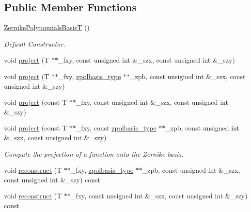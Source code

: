 \subsection*{Public Member Functions}
\begin{DoxyCompactItemize}
\item 
\hyperlink{classzsig_1_1ZernikePolynomialsBasisT_a214ad8861d4f318e10b7a3098ff9057e}{ZernikePolynomialsBasisT} ()
\begin{DoxyCompactList}\small\item\em Default Constructor. \item\end{DoxyCompactList}\item 
void \hyperlink{classzsig_1_1ZernikePolynomialsBasisT_aba8cb52c2e02043ec97114c7ad7f9041}{project} (T $\ast$$\ast$\_\-fxy, const unsigned int \&\_\-szx, const unsigned int \&\_\-szy)
\item 
void \hyperlink{classzsig_1_1ZernikePolynomialsBasisT_a0925687fb6a1c9f7fe6b22f4592fe96d}{project} (T $\ast$$\ast$\_\-fxy, \hyperlink{classzsig_1_1ZernikePolynomialsBasisT}{zpolbasis\_\-type} $\ast$$\ast$\_\-zpb, const unsigned int \&\_\-szx, const unsigned int \&\_\-szy)
\item 
void \hyperlink{classzsig_1_1ZernikePolynomialsBasisT_a3cdbccd97f083e952bcdc7640718f52f}{project} (const T $\ast$$\ast$\_\-fxy, const unsigned int \&\_\-szx, const unsigned int \&\_\-szy)
\item 
void \hyperlink{classzsig_1_1ZernikePolynomialsBasisT_abf9403a1fe296638542132488c8c7187}{project} (const T $\ast$$\ast$\_\-fxy, const \hyperlink{classzsig_1_1ZernikePolynomialsBasisT}{zpolbasis\_\-type} $\ast$$\ast$\_\-zpb, const unsigned int \&\_\-szx, const unsigned int \&\_\-szy)
\begin{DoxyCompactList}\small\item\em Compute the projection of a function onto the Zernike basis. \item\end{DoxyCompactList}\item 
void \hyperlink{classzsig_1_1ZernikePolynomialsBasisT_a62ba4a56669768b02abee187a5d2f1eb}{reconstruct} (T $\ast$$\ast$\_\-fxy, \hyperlink{classzsig_1_1ZernikePolynomialsBasisT}{zpolbasis\_\-type} $\ast$$\ast$\_\-zpb, const unsigned int \&\_\-szx, const unsigned int \&\_\-szy) const 
\item 
void \hyperlink{classzsig_1_1ZernikePolynomialsBasisT_a0ce02089d49b0dff9add1131ed78e2e0}{reconstruct} (T $\ast$$\ast$\_\-fxy, const unsigned int \&\_\-szx, const unsigned int \&\_\-szy) const 
$$
\end{DoxyCompactItemize}
